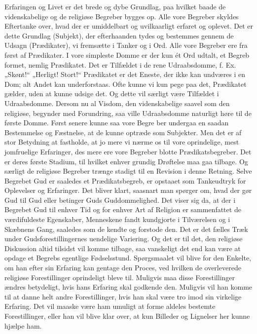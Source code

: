 \documentclass[12pt,a4paper]{article}
\newcommand{\opage}[1]{\marginnote{\footnotesize\textit{[#1]}}}
\begin{document}
Erfaringen og Livet er det brede og dybe Grundlag, paa hvilket baade de
videnskabelige og de religiøse Begreber bygges op. Alle vore Begreber skyldes
Eftertanke over, hvad der er umiddelbart og uvilkaarligt erfaret og oplevet. Det
er dette Grundlag (Subjekt), der efterhaanden tydes og bestemmes gennem de
Udsagn (Prædikater), vi fremsætte i Tanker og i Ord. Alle vore Begreber ere fra
først af Prædikater. I vore simpleste Domme er der kun ét Ord udtalt, et Begreb
formet, nemlig Prædikatet. Det er Tilfældet i de rene Udraabsdomme, f. Ex.
„Skønt!“ „Herligt! Stort!“ Prædikatet er det Eneste, der ikke kan undværes i en
Dom; alt Andet kan underforstaas. Ofte kunne vi kun pege paa det, Prædikatet
gælder, uden at kunne udsige det. Og dette vil særligt være Tilfældet i
Udraabsdomme. Dersom nu al Visdom, den videnskabelige saavel som den religiøse,
begynder med Forundring, saa ville Udraabsdomme naturligt høre til de første
Domme. Først senere kunne saa vore Begre%
\opage{56}ber undergaa en saadan Bestemmelse og
Fæstnelse, at de kunne optræde som Subjekter. Men det er af stor Betydning at
fastholde, at jo mere vi nærme os til vore oprindelige, mest jomfruelige
Erfaringer, des mere ere vore Begreber blotte Prædikatsbegreber. Det er deres
første Stadium, til hvilket enhver grundig Drøftelse maa gaa tilbage. Og særligt
de religiøse Begreber trænge stadigt til en Revision i denne Retning. Selve
Begrebet Gud er saaledes et Prædikatsbegreb, er opstaaet som Tankeudtryk for
Oplevelser og Erfaringer. Det bliver klart, saasnart man spørger om, hvad der
gør Gud til Gud eller betinger Guds Guddommelighed. Det viser sig da, at der i
Begrebet Gud til enhver Tid og for enhver Art af Religion er sammenfattet de
værdifuldeste Egenskaber, Menneskene fandt kundgjorte i Tilværelsen og i
Skæbnens Gang, saaledes som de kendte og forstode den. Det er det fælles Træk
under Gudsforestillingernes uendelige Variering. Og det er til det, den religiøse
Diskussion altid tilsidst vil komme tilbage, saa vanskeligt det end kan være at
opdage et Begrebs egentlige Fødselsstund. Spørgsmaalet vil blive for den Enkelte,
om han efter sin Erfaring kan gentage den Proces, ved hvilken de overleverede
religiøse Forestillinger oprindeligt bleve til. Muligvis maa disse Forestillinger
ændres betydeligt, hvis hans Erfaring skal godkende den. Muligvis vil han komme
til at danne helt andre Forestillinger, hvis han skal være tro imod sin virkelige
Erfaring. Det vil maaske være ham umuligt at forme aldeles bestemte
Forestillinger, eller han vil blive klar over, at kun Billeder og Lignelser her
kunne hjælpe ham.
\end{document}
